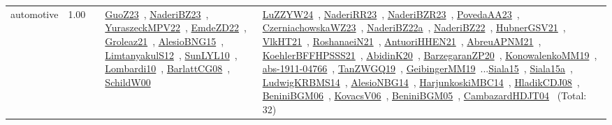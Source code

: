 {\begin{longtable}{p{3cm}r>{\raggedright\arraybackslash}p{6cm}>{\raggedright\arraybackslash}p{6cm}>{\raggedright\arraybackslash}p{8cm}}
\index{automotive}\index{ApplicationAreas!automotive}automotive &  1.00 &  & \href{../works/GuoZ23.pdf}{GuoZ23}~\cite{GuoZ23}, \href{../works/NaderiBZ23.pdf}{NaderiBZ23}~\cite{NaderiBZ23}, \href{../works/YuraszeckMPV22.pdf}{YuraszeckMPV22}~\cite{YuraszeckMPV22}, \href{../works/EmdeZD22.pdf}{EmdeZD22}~\cite{EmdeZD22}, \href{../works/Groleaz21.pdf}{Groleaz21}~\cite{Groleaz21}, \href{../works/AlesioBNG15.pdf}{AlesioBNG15}~\cite{AlesioBNG15}, \href{../works/LimtanyakulS12.pdf}{LimtanyakulS12}~\cite{LimtanyakulS12}, \href{../works/SunLYL10.pdf}{SunLYL10}~\cite{SunLYL10}, \href{../works/Lombardi10.pdf}{Lombardi10}~\cite{Lombardi10}, \href{../works/BarlattCG08.pdf}{BarlattCG08}~\cite{BarlattCG08}, \href{../works/SchildW00.pdf}{SchildW00}~\cite{SchildW00} & \href{../works/LuZZYW24.pdf}{LuZZYW24}~\cite{LuZZYW24}, \href{../works/NaderiRR23.pdf}{NaderiRR23}~\cite{NaderiRR23}, \href{../works/NaderiBZR23.pdf}{NaderiBZR23}~\cite{NaderiBZR23}, \href{../works/PovedaAA23.pdf}{PovedaAA23}~\cite{PovedaAA23}, \href{../works/CzerniachowskaWZ23.pdf}{CzerniachowskaWZ23}~\cite{CzerniachowskaWZ23}, \href{../works/NaderiBZ22a.pdf}{NaderiBZ22a}~\cite{NaderiBZ22a}, \href{../works/NaderiBZ22.pdf}{NaderiBZ22}~\cite{NaderiBZ22}, \href{../works/HubnerGSV21.pdf}{HubnerGSV21}~\cite{HubnerGSV21}, \href{../works/VlkHT21.pdf}{VlkHT21}~\cite{VlkHT21}, \href{../works/RoshanaeiN21.pdf}{RoshanaeiN21}~\cite{RoshanaeiN21}, \href{../works/AntuoriHHEN21.pdf}{AntuoriHHEN21}~\cite{AntuoriHHEN21}, \href{../works/AbreuAPNM21.pdf}{AbreuAPNM21}~\cite{AbreuAPNM21}, \href{../works/KoehlerBFFHPSSS21.pdf}{KoehlerBFFHPSSS21}~\cite{KoehlerBFFHPSSS21}, \href{../works/AbidinK20.pdf}{AbidinK20}~\cite{AbidinK20}, \href{../works/BarzegaranZP20.pdf}{BarzegaranZP20}~\cite{BarzegaranZP20}, \href{../works/KonowalenkoMM19.pdf}{KonowalenkoMM19}~\cite{KonowalenkoMM19}, \href{../works/abs-1911-04766.pdf}{abs-1911-04766}~\cite{abs-1911-04766}, \href{../works/TanZWGQ19.pdf}{TanZWGQ19}~\cite{TanZWGQ19}, \href{../works/GeibingerMM19.pdf}{GeibingerMM19}~\cite{GeibingerMM19}...\href{../works/Siala15.pdf}{Siala15}~\cite{Siala15}, \href{../works/Siala15a.pdf}{Siala15a}~\cite{Siala15a}, \href{../works/LudwigKRBMS14.pdf}{LudwigKRBMS14}~\cite{LudwigKRBMS14}, \href{../works/AlesioNBG14.pdf}{AlesioNBG14}~\cite{AlesioNBG14}, \href{../works/HarjunkoskiMBC14.pdf}{HarjunkoskiMBC14}~\cite{HarjunkoskiMBC14}, \href{../works/HladikCDJ08.pdf}{HladikCDJ08}~\cite{HladikCDJ08}, \href{../works/BeniniBGM06.pdf}{BeniniBGM06}~\cite{BeniniBGM06}, \href{../works/KovacsV06.pdf}{KovacsV06}~\cite{KovacsV06}, \href{../works/BeniniBGM05.pdf}{BeniniBGM05}~\cite{BeniniBGM05}, \href{../works/CambazardHDJT04.pdf}{CambazardHDJT04}~\cite{CambazardHDJT04} (Total: 32)\\

\end{longtable}}
